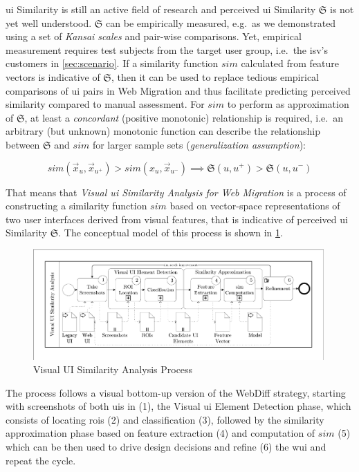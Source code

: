 \gls{ui} Similarity is still an active field of research and perceived \gls{ui} Similarity \(\mathfrak{S}\) is not yet well understood.
\(\mathfrak{S}\) can be empirically measured, e.g.~as we demonstrated using a set of \emph{Kansai scales} \autocite{Bakaev2017Kansei} and pair-wise comparisons.
Yet, empirical measurement requires test subjects from the target user group, i.e.~the \gls{isv}'s customers in \cref{sec:scenario}.
If a similarity function \(sim\) calculated from feature vectors is indicative of \(\mathfrak{S}\), then it can be used to replace tedious empirical comparisons of \gls{ui} pairs in \gls{Web Migration} and thus facilitate predicting perceived similarity compared to manual assessment.
For \(sim\) to perform as approximation of \(\mathfrak{S}\), at least a \emph{concordant} (positive monotonic) relationship is required, i.e.~an arbitrary (but unknown) monotonic function can describe the relationship between \(\mathfrak{S}\) and \(sim\) for larger sample sets (\emph{generalization assumption}):

\begin{equation}sim(\vec x_u, \vec x_{u^+}) > sim(x_u, \vec x_{u^-}) \implies \mathfrak{S}(u, u^+) > \mathfrak{S}(u, u^-)\label{eq:sim-assumption}\end{equation}

That means that \emph{Visual \gls{ui} Similarity Analysis for \gls{Web Migration}} is a process of constructing a similarity function \(sim\) based on vector-space representations of two user interfaces derived from visual features, that is indicative of perceived \gls{ui} Similarity \(\mathfrak{S}\).
The conceptual model of this process is shown in \cref{fig:ci-process}.

\begin{figure}[h!]
\hypertarget{fig:ci-process}{%
\centering
\includegraphics[width=0.99\textwidth]{../figures/awsm-ci-process.pdf}
\caption{Visual UI Similarity Analysis Process}\label{fig:ci-process}
}
\end{figure}
The process follows a visual bottom-up version of the WebDiff strategy, starting with screenshots of both \glspl{ui} in (1), the Visual \gls{ui} Element Detection phase, which consists of locating \glspl{roi} (2) and classification (3), followed by the similarity approximation phase based on feature extraction (4) and computation of \(sim\) (5) which can be then used to drive design decisions and refine (6) the \gls{wui} and repeat the cycle.

